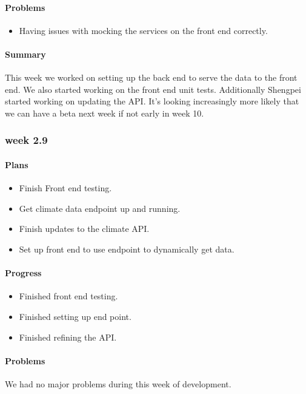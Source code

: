 \documentclass[onecolumn, draftclsnofoot,10pt, compsoc]{article}
\begin{document}
			\paragraph{Problems} \hfill \break
				\begin{itemize}
					\item Having issues with mocking the services on the front end correctly.
				\end{itemize}
			\paragraph{Summary} \hfill \break
			This week we worked on setting up the back end to serve the data to the front end. We also started working on the front end unit tests. Additionally Shengpei started working on updating the API. It's looking increasingly more likely that we can have a beta next week if not early in week 10.\\

		\subsubsection{week 2.9}
			\paragraph{Plans} \hfill \break
				\begin{itemize}
					\item Finish Front end testing.
					\item Get climate data endpoint up and running.
					\item Finish updates to the climate API.
					\item Set up front end to use endpoint to dynamically get data.
				\end{itemize}
			\paragraph{Progress} \hfill \break
				\begin{itemize}
					\item Finished front end testing.
					\item Finished setting up end point.
					\item Finished refining the API.
				\end{itemize}
			\paragraph{Problems} \hfill \break
				We had no major problems during this week of development.\\
\end{document}
